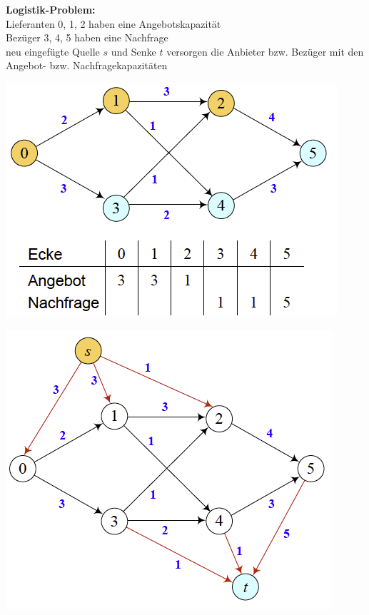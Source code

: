 \begin{minipage}{0.33\textwidth}
	\textbf{Logistik-Problem:}\\
	
	Lieferanten 0, 1, 2 haben eine Angebotskapazität\\
	Bezüger 3, 4, 5 haben eine Nachfrage\\
	neu eingefügte Quelle $s$ und Senke $t$ versorgen die Anbieter bzw. Bezüger mit den Angebot- bzw. Nachfragekapazitäten
\end{minipage}
\begin{minipage}{0.33\textwidth}
	\includegraphics[width=\textwidth]{Content/Graphen/LogProb1.png}
\end{minipage}
\begin{minipage}{0.33\textwidth}	
	\includegraphics[width=\textwidth]{Content/Graphen/LogProb2.png}
\end{minipage}




